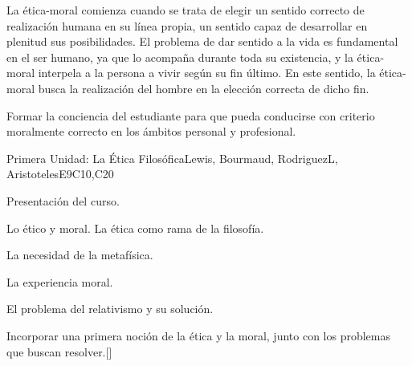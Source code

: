 \begin{syllabus}


\begin{justification}
La ética-moral comienza cuando se trata de elegir un sentido correcto de realización humana en su línea propia, un sentido capaz de desarrollar en plenitud sus posibilidades.
El problema de dar sentido a la vida es fundamental en el ser humano, ya que lo acompaña durante toda su existencia, y la ética-moral interpela a la persona a vivir según su fin último. En este sentido, la ética-moral busca la realización del hombre en la elección correcta de dicho fin.
\end{justification}

\begin{goals}
\item Formar la conciencia del estudiante para que pueda conducirse con criterio moralmente correcto en los ámbitos personal y profesional.

\end{goals}

\begin{outcomes}
    \item {}
    \item {}
\end{outcomes}

\begin{competences}
    \item {}
    \item {}
    \item {}
    \item {}
\end{competences}

\begin{unit}{}{Primera Unidad: La Ética Filosófica}{Lewis, Bourmaud, RodriguezL, AristotelesE}{9}{C10,C20}
\begin{topics}
    \item Presentación del curso.
    \item Lo ético y moral. La ética como rama de la filosofía.
    \item La necesidad de la metafísica.
    \item La experiencia moral.
    \item El problema del relativismo y su solución.
	
\end{topics}
\begin{learningoutcomes}
	\item Incorporar una primera noción de la ética y la moral, junto con los problemas que buscan resolver.[\Familiarity]
\end{learningoutcomes}
\end{unit}


\end{syllabus}
